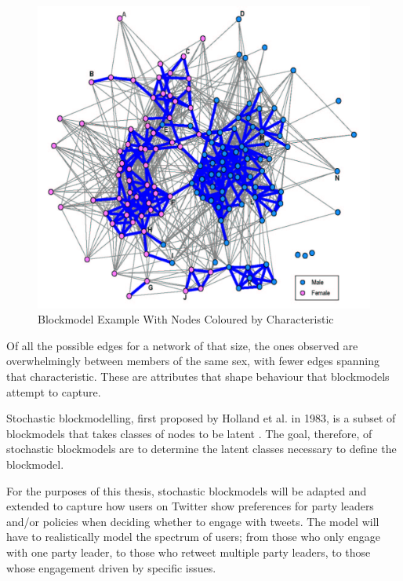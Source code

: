 \begin{singlespacing}
    \begin{figure}[H]
    \centering
    \includegraphics[scale=0.2]{Figures/blockmodel_ex}
    \caption[Friendship Blockmodel With Nodes Coloured by Sex]{Blockmodel Example With Nodes Coloured by Characteristic}
    \label{fig:blockmodel_ex}
    \end{figure}
\end{singlespacing}

Of all the possible edges for a network of that size, the ones observed are
overwhelmingly between members of the same sex, with fewer edges spanning that
characteristic. These are attributes that shape behaviour that blockmodels
attempt to capture. 

Stochastic blockmodelling, first proposed by Holland et al. in 1983, is a subset
of blockmodels that takes classes of nodes to be latent
\cite{holland1983stochastic}. The goal, therefore, of stochastic blockmodels are
to determine the latent classes necessary to define the blockmodel. 

For the purposes of this thesis, stochastic blockmodels will be adapted and
extended to capture how users on Twitter show preferences for party leaders
and/or policies when deciding whether to engage with tweets. The model will have
to realistically model the spectrum of users; from those who only engage with
one party leader, to those who retweet multiple party leaders, to those whose
engagement driven by specific issues. 
	
